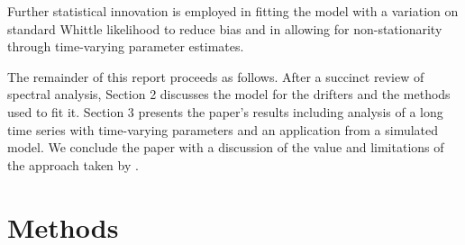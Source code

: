 \documentclass{stat572Style}
\begin{document}
Further statistical innovation is employed in fitting the model with a variation on standard Whittle likelihood to reduce bias and in allowing for non-stationarity through time-varying parameter estimates.
\par
The remainder of this report proceeds as follows.
 After a succinct review of spectral analysis, Section 2 discusses the model for the drifters and the methods used to fit it. 
 Section 3 presents the paper's results including analysis of a long time series with time-varying parameters and an application from a simulated model. 
We conclude the paper with a discussion of the value and limitations of the approach taken by \citet{Sykulski2016}. 






\section{Methods}
			
\end{document}
